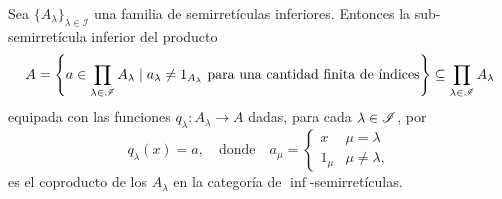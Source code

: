\begin{lemma}
  Sea $\{A_\lambda\}_{\lambda\in\mathscr I}$ una familia de
  semirretículas inferiores.
  Entonces la sub-semirretícula inferior del producto
  \[
    A=
    \left\{ a\in\prod_{\lambda\in\mathscr{I}} A_\lambda
    \mid a_\lambda\neq 1_{A_\lambda}
    \text{ para una cantidad finita de índices} \right\}
    \subseteq
    \prod_{\lambda\in\mathscr I} A_\lambda
  \]
  equipada con las funciones $q_\lambda\colon A_\lambda\to A$
  dadas, para cada $\lambda\in \mathscr{I}$, por
    \[
      q_\lambda(x)=a,
      \quad
      \text{donde}
      \quad
      a_\mu =
       \begin{cases}
         x & \mu=\lambda \\
         1_\mu & \mu\neq\lambda,
      \end{cases}
    \]
  es el coproducto de los $A_\lambda$ en la categoría de
  $\inf$-semirretículas.
\end{lemma}
